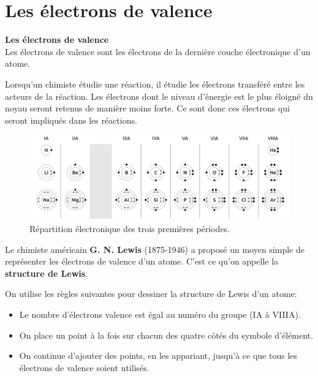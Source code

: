 \documentclass[
  11pt,
  french,
  a4paper,
  openany]{book}
\providecommand{\tightlist}{%
  \setlength{\itemsep}{0pt}\setlength{\parskip}{0pt}}
\begin{document}
\hypertarget{les-uxe9lectrons-de-valence}{%
\section{Les électrons de valence}\label{les-uxe9lectrons-de-valence}}

\begin{tcolorbox}
\textbf{Les électrons de valence}\\
Les électrons de valence sont les électrons de la dernière couche électronique d'un atome.

\end{tcolorbox}

Lorsqu'un chimiste étudie une réaction, il étudie les électrons transféré entre les acteurs de la réaction. Les électrons dont le niveau d'énergie est le plus éloigné du noyau seront retenus de manière moins forte. Ce sont donc ces électrons qui seront impliqués dans les réactions.

\begin{figure}

{\centering \includegraphics[width=1\linewidth]{images/configuration-electronique} 

}

\caption{Répartition électronique des trois premières périodes.}\label{fig:configuration-electronique}
\end{figure}

Le chimiste américain \textbf{G. N. Lewis} (1875-1946) a proposé un moyen simple de représenter les électrons de valence d'un atome. C'est ce qu'on appelle la \textbf{structure de Lewis}.

On utilise les règles suivantes pour dessiner la structure de Lewis d'un atome:

\begin{itemize}
\tightlist
\item
  Le nombre d'électrons valence est égal au numéro du groupe (IA à VIIIA).
\item
  On place un point à la fois sur chacun des quatre côtés du symbole d'élément.
\item
  On continue d'ajouter des points, en les appariant, jusqu'à ce que tous les électrons de valence soient utilisés.
\end{itemize}
\end{document}
